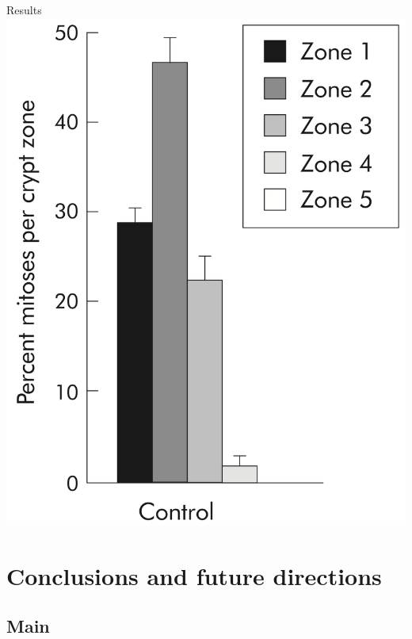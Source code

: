 \documentclass[t,xcolor={usenames,dvipsnames}]{beamer}
\begin{document}
\begin{frame}{Results}
\includegraphics[height=.4\textheight]{WongFigure}
\end{frame}


\section{Conclusions and future directions}
\subsection*{Main}
\end{document}
